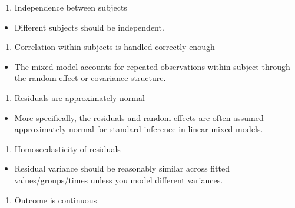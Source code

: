 \documentclass[
]{article}
\providecommand{\tightlist}{%
  \setlength{\itemsep}{0pt}\setlength{\parskip}{0pt}}
\begin{document}
\begin{enumerate}
\def\labelenumi{\arabic{enumi}.}
\setcounter{enumi}{1}
\tightlist
\item
  Independence between subjects
\end{enumerate}

\begin{itemize}
\tightlist
\item
  Different subjects should be independent.
\end{itemize}

\begin{enumerate}
\def\labelenumi{\arabic{enumi}.}
\setcounter{enumi}{2}
\tightlist
\item
  Correlation within subjects is handled correctly enough
\end{enumerate}

\begin{itemize}
\tightlist
\item
  The mixed model accounts for repeated observations within subject
  through the random effect or covariance structure.
\end{itemize}

\begin{enumerate}
\def\labelenumi{\arabic{enumi}.}
\setcounter{enumi}{3}
\tightlist
\item
  Residuals are approximately normal
\end{enumerate}

\begin{itemize}
\tightlist
\item
  More specifically, the residuals and random effects are often assumed
  approximately normal for standard inference in linear mixed models.
\end{itemize}

\begin{enumerate}
\def\labelenumi{\arabic{enumi}.}
\setcounter{enumi}{4}
\tightlist
\item
  Homoscedasticity of residuals
\end{enumerate}

\begin{itemize}
\tightlist
\item
  Residual variance should be reasonably similar across fitted
  values/groups/times unless you model different variances.
\end{itemize}

\begin{enumerate}
\def\labelenumi{\arabic{enumi}.}
\setcounter{enumi}{5}
\tightlist
\item
  Outcome is continuous
\end{enumerate}
\end{document}

